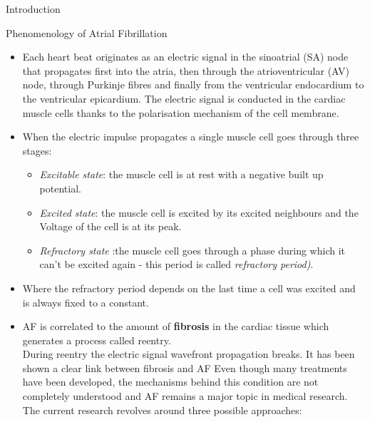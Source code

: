 \documentclass[final,hyperref={pdfpagelabels=false}]{beamer}
\begin{document}
\begin{frame}[t]
\begin{columns}[t]
\begin{column}{.465\textwidth}
\begin{block}{Introduction}
\end{block}


\begin{block}{Phenomenology of Atrial Fibrillation}


	\begin{itemize}
	\item Each heart beat originates as an electric signal in the sinoatrial (SA) node that propagates first into the atria, then through the atrioventricular (AV) node, through Purkinje fibres 		and finally from the ventricular endocardium to the ventricular epicardium. The electric signal is conducted in the cardiac muscle cells thanks to the polarisation mechanism of the cell 		membrane. 


	\item When the electric impulse propagates a single muscle cell goes through three stages:

		\begin{itemize}
 		 \item \textit{Excitable state}: the muscle cell is at rest with a negative built up potential.
  										
  		\item \textit{Excited state}: the muscle cell is excited by its excited neighbours and the Voltage of the cell is at its peak. 
  		\item \textit{Refractory state} :the muscle cell goes through a phase during which it can't be excited again - this period is called \textit{refractory period)}.
		\end{itemize}  

	\item Where the refractory period depends on the last time a cell was excited and is always fixed to a constant.\\



	\item AF is correlated to the amount of \textbf{ fibrosis} in the cardiac tissue which generates a process called reentry. \\
	During reentry the electric signal wavefront propagation breaks. It has been shown a clear link between fibrosis and AF
	Even though many treatments have been developed, the mechanisms behind this condition are not completely understood and AF remains a major topic in medical research. \\
	The current research revolves around three possible approaches:
	\end{itemize}


\end{block}
\end{column}
\end{columns}
\end{frame}
\end{document}
